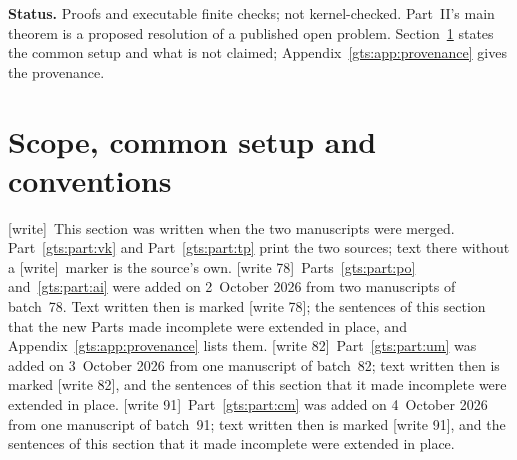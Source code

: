 \documentclass[11pt,letterpaper]{article}
\theoremstyle{definition}
\theoremstyle{remark}
\newcommand{\Z}{\mathbb Z}
\newcommand{\SL}{\operatorname{SL}}
\newcommand{\wtag}{\textup{[write]}}
\newcommand{\wtagb}{\textup{[write 78]}}
\newcommand{\wtagc}{\textup{[write 82]}}
\newcommand{\wtagd}{\textup{[write 91]}}
\begin{document}
\begin{titlepage}
\begin{abstract}
Part~III (source~06) proves that the pair counts of three-letter words leave no holes, and compiles exact quadratic and canonical quartic certificates of word realizability in three-generator Heisenberg submonoids. Part~IV (source~07) proves that an affine unimodular input curve meets every fixed subgroup of $\SL_d(\Z)$ in a finite or exactly periodic set, so that input degree two is sharp in every dimension, and compiles polynomial circuits into a fixed free-abelian unipotent subgroup when affine coordinates are existentially quantified.

Part~V (source~08) gives 229 literal matrices in $\SL_4(\Z)$ whose positive semigroup has the finite-tape halting problem of the Neary--Woods universal machine as its membership problem (r.e.-complete conditionally on the cited Neary--Woods chain), quartic certificates with $130r$ witnesses for each length~$r$, and an exact generating function for the fibre of an accepted input.

Part~VI (source~09) gives one fixed-arity polynomial of exact degree twelve (41,309 positive witnesses, 184,016 gates) recognizing, for histories of every length, the inputs accepted by a fixed-context matrix countdown of the research programme, whose semigroup descends from Part~V's.

The report is AI-assisted and unrefereed; nothing in it is formalized in Lean or Rocq, and priority is not certified for any Part.
\end{abstract}
\vfill
\noindent\small\textbf{Status.} Proofs and executable finite checks; not kernel-checked. Part~II's main theorem is a proposed resolution of a published open problem. Section~\ref{gts:sec:front} states the common setup and what is not claimed; Appendix~\ref{gts:app:provenance} gives the provenance.
\end{titlepage}
\hypersetup{pageanchor=true}

\tableofcontents
\newpage

\section{Scope, common setup and conventions}\label{gts:sec:front}

\wtag\ This section was written when the two manuscripts were merged. Part~\ref{gts:part:vk} and Part~\ref{gts:part:tp} print the two sources; text there without a \wtag\ marker is the source's own. \wtagb\ Parts~\ref{gts:part:po} and~\ref{gts:part:ai} were added on 2~October 2026 from two manuscripts of batch~78. Text written then is marked \wtagb; the sentences of this section that the new Parts made incomplete were extended in place, and Appendix~\ref{gts:app:provenance} lists them. \wtagc\ Part~\ref{gts:part:um} was added on 3~October 2026 from one manuscript of batch~82; text written then is marked \wtagc, and the sentences of this section that it made incomplete were extended in place. \wtagd\ Part~\ref{gts:part:cm} was added on 4~October 2026 from one manuscript of batch~91; text written then is marked \wtagd, and the sentences of this section that it made incomplete were extended in place.
\end{document}
